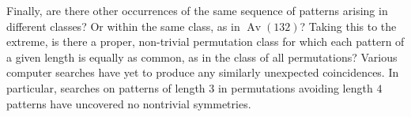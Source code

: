 \documentclass[11pt]{article} %
\theoremstyle{plain}
\theoremstyle{definition}
\DeclareMathOperator{\Av}{Av}
\begin{document}
  Finally, are there other occurrences of the same sequence of patterns
  arising in different classes? Or within the same class, as in
  $\Av (132)$? Taking this to the extreme, is there a proper, non-trivial
  permutation class for which each pattern of a given length is
  equally as common, as in the class of all permutations?
  Various computer searches have yet to produce any similarly
  unexpected coincidences.  In particular, searches on patterns of
  length $3$ in permutations avoiding length $4$ patterns
  have uncovered no nontrivial symmetries.

\nocite{*}




%
%
%
%
%
%
%
%
%
%
\end{document}

